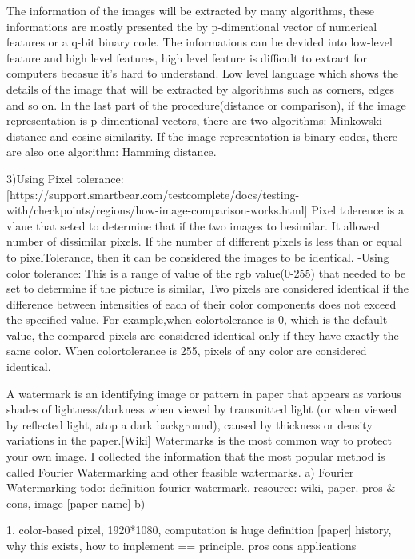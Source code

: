 The information of the images will be extracted by many algorithms, 
these informations are mostly presented the by p-dimentional vector of numerical features or a q-bit binary code.
The informations can be devided into low-level feature and high level features, 
high level feature is difficult to extract for computers becasue it's hard to understand.
Low level language which shows the details of the image that will be extracted by algorithms such as corners, edges and so on.
In the last part of the procedure(distance or comparison), if the image representation is p-dimentional vectors,
there are two algorithms: Minkowski distance and cosine similarity. If the image representation is binary codes, 
there are also one algorithm: Hamming distance.

3)Using Pixel tolerance:
[https://support.smartbear.com/testcomplete/docs/testing-with/checkpoints/regions/how-image-comparison-works.html]
Pixel tolerence is a vlaue that seted to determine that if the two images to besimilar.
It allowed number of dissimilar pixels. 
If the number of different pixels is less than or equal to pixelTolerance, 
then it can be considered the images to be identical.
-Using color tolerance:
This is a range of value of the rgb value(0-255) that needed to be set to determine if the picture is similar,
Two pixels are considered identical if the difference between intensities of each of their color components does not exceed the specified value.
For example,when colortolerance is 0, which is the default value, the compared pixels are considered identical only if they have exactly the same color. 
When colortolerance is 255, pixels of any color are considered identical.


A watermark is an identifying image or pattern in paper that appears as various shades of lightness/darkness when viewed by transmitted light (or when viewed by reflected light, atop a dark background), 
caused by thickness or density variations in the paper.[Wiki]
Watermarks is the most common way to protect your own image.
I collected the information that the most popular method is called Fourier Watermarking and other feasible watermarks.
a) Fourier Watermarking
todo: definition fourier watermark. resource: wiki, paper. pros & cons, image [paper name]
b)






1. color-based pixel, 1920*1080, computation is huge
definition [paper] \cite{}
history, why this exists, 
how to implement == principle.
pros cons
applications

